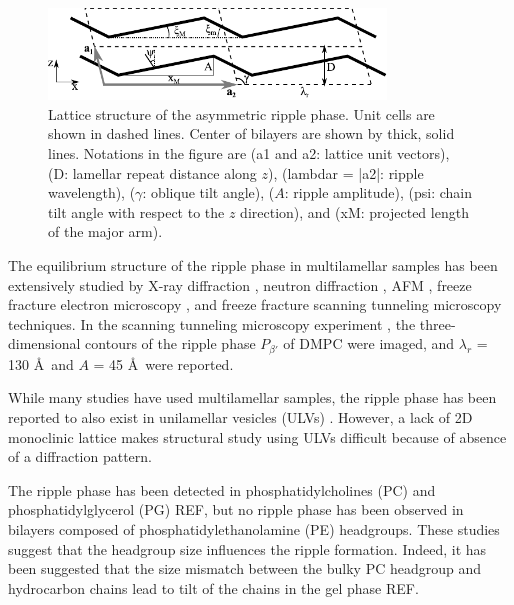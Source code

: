 \begin{figure}[htbp]
  \centering
  \includegraphics[width=0.8\textwidth]{figures/ripple/unit_cell}
  \caption[Lattice structure of the asymmetric ripple phase]
  {Lattice structure of the asymmetric ripple phase. Unit cells are shown in
  dashed lines. Center of bilayers are shown by thick, solid lines. Notations 
  in the figure are (\gls{a1} and \gls{a2}: lattice unit vectors),
  (\gls{D}: lamellar repeat distance along $z$), (\gls{lambdar} = |\gls{a2}|: ripple wavelength), 
  ($\gamma$: oblique tilt angle), ($A$: ripple amplitude),
  (\gls{psi}: chain tilt angle with respect to the $z$ direction),
  and (\gls{xM}: projected length of the major arm).}
  \label{fig:unit_cell}
\end{figure}

The equilibrium structure of the ripple phase in multilamellar samples has been extensively studied by
X-ray diffraction \cite{ref:Janiak76,ref:Janiak79,ref:Tardieu73,ref:Wack89,ref:Yao91,ref:Sun96,ref:Cunningham98},
neutron diffraction \cite{ref:Mortensen88,ref:Bradshaw89}, 
AFM \cite{}, freeze fracture electron microscopy \cite{ref:Woodward96},
and freeze fracture scanning tunneling microscopy \cite{} techniques.
In the scanning tunneling microscopy experiment \cite{ref:Zasadzinski88}, 
the three-dimensional contours of the ripple phase $P_{\beta'}$ of
DMPC were imaged, and $\lambda_r$ = 130 \AA\ and $A$ = 45 \AA\ were reported.

While many studies have used multilamellar samples, the ripple phase has been reported
to also exist in unilamellar vesicles (ULVs) \cite{ref:Mason99}. However,
a lack of 2D monoclinic lattice makes structural study using ULVs difficult
because of absence of a diffraction pattern. 

The ripple phase has been detected in
phosphatidylcholines (\gls{PC}) and phosphatidylglycerol (\gls{PG}) {\jn REF},
but no ripple phase has been observed in bilayers composed of 
phosphatidylethanolamine (\gls{PE}) headgroups.
These studies suggest that the headgroup size influences
the ripple formation. Indeed, it has been suggested that the size mismatch
between the bulky PC headgroup and hydrocarbon chains lead to tilt of 
the chains in the gel phase {\jn REF}. 

